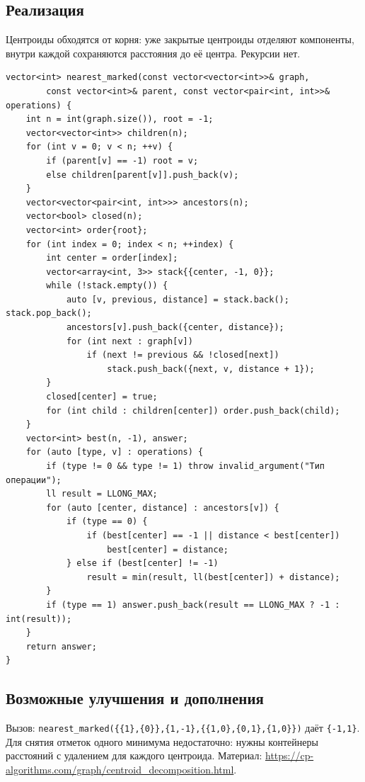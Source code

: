 \subsection*{Реализация}
Центроиды обходятся от корня: уже закрытые центроиды отделяют компоненты,
внутри каждой сохраняются расстояния до её центра. Рекурсии нет.
\begin{lstlisting}[name=supplement_centroid_queries]
vector<int> nearest_marked(const vector<vector<int>>& graph,
        const vector<int>& parent, const vector<pair<int, int>>& operations) {
    int n = int(graph.size()), root = -1;
    vector<vector<int>> children(n);
    for (int v = 0; v < n; ++v) {
        if (parent[v] == -1) root = v;
        else children[parent[v]].push_back(v);
    }
    vector<vector<pair<int, int>>> ancestors(n);
    vector<bool> closed(n);
    vector<int> order{root};
    for (int index = 0; index < n; ++index) {
        int center = order[index];
        vector<array<int, 3>> stack{{center, -1, 0}};
        while (!stack.empty()) {
            auto [v, previous, distance] = stack.back(); stack.pop_back();
            ancestors[v].push_back({center, distance});
            for (int next : graph[v])
                if (next != previous && !closed[next])
                    stack.push_back({next, v, distance + 1});
        }
        closed[center] = true;
        for (int child : children[center]) order.push_back(child);
    }
    vector<int> best(n, -1), answer;
    for (auto [type, v] : operations) {
        if (type != 0 && type != 1) throw invalid_argument("Тип операции");
        ll result = LLONG_MAX;
        for (auto [center, distance] : ancestors[v]) {
            if (type == 0) {
                if (best[center] == -1 || distance < best[center])
                    best[center] = distance;
            } else if (best[center] != -1)
                result = min(result, ll(best[center]) + distance);
        }
        if (type == 1) answer.push_back(result == LLONG_MAX ? -1 : int(result));
    }
    return answer;
}
\end{lstlisting}
\subsection*{Возможные улучшения и дополнения}
Вызов: \texttt{nearest\_marked(\{\{1\},\{0\}\},\{1,-1\},\{\{1,0\},\{0,1\},\{1,0\}\})}
даёт \texttt{\{-1,1\}}. Для снятия отметок одного минимума недостаточно:
нужны контейнеры расстояний с удалением для каждого центроида.
Материал: \url{https://cp-algorithms.com/graph/centroid_decomposition.html}.

